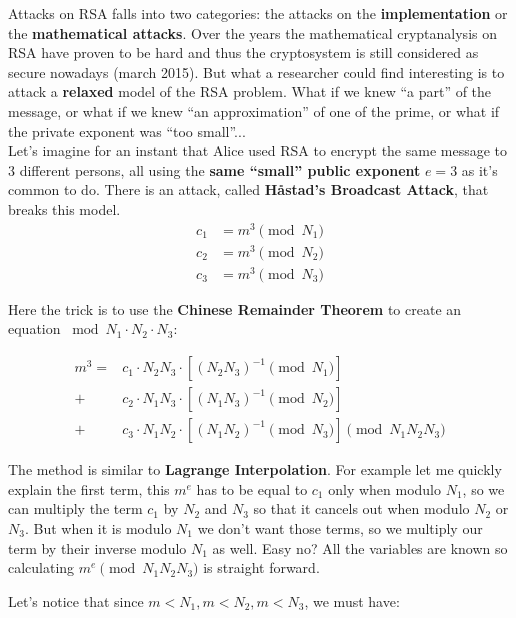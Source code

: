 \documentclass[a4paper,11pt]{article}
\begin{document}
Attacks on RSA falls into two categories: the attacks on the \textbf{implementation} or the \textbf{mathematical attacks}. Over the years the mathematical cryptanalysis on RSA have proven to be hard and thus the cryptosystem is still considered as secure nowadays (march 2015). But what a researcher could find interesting is to attack a \textbf{relaxed} model of the RSA problem. What if we knew ``a part'' of the message, or what if we knew ``an approximation'' of one of the prime, or what if the private exponent was ``too small''...\\

Let's imagine for an instant that Alice used RSA to encrypt the same message to 3 different persons, all using the \textbf{same ``small'' public exponent} $e = 3$ as it's common to do. There is an attack, called \textbf{Håstad's Broadcast Attack}, that breaks this model.\\


\begin{align*}
	c_1 &= m^3 \pmod{N_1}\\
	c_2 &= m^3 \pmod{N_2}\\
	c_3 &= m^3 \pmod{N_3}
\end{align*}

Here the trick is to use the \textbf{Chinese Remainder Theorem} to create an equation $\bmod{N_1 \cdot N_2 \cdot N_3}$:

\begin{align*}
	m^3 = &c_1 \cdot N_2 N_3 \cdot [(N_2 N_3)^{-1} \pmod{N_1}] \\
			 + &c_2 \cdot N_1 N_3 \cdot [(N_1 N_3)^{-1} \pmod{N_2}] \\
			 + &c_3 \cdot N_1 N_2 \cdot [(N_1 N_2)^{-1} \pmod{N_3}] 
			 \pmod{N_1 N_2 N_3}
\end{align*}

The method is similar to \textbf{Lagrange Interpolation}. For example let me quickly explain the first term, this $m^e$ has to be equal to $c_1$ only when modulo $N_1$, so we can multiply the term $c_1$ by $N_2$ and $N_3$ so that it cancels out when modulo $N_2$ or $N_3$. But when it is modulo $N_1$ we don't want those terms, so we multiply our term by their inverse modulo $N_1$ as well. Easy no? All the variables are known so calculating $m^e \pmod{N_1 N_2 N_3}$ is straight forward.

Let's notice that since  $m < N_1, m < N_2, m < N_3$, we must have:
\end{document}
